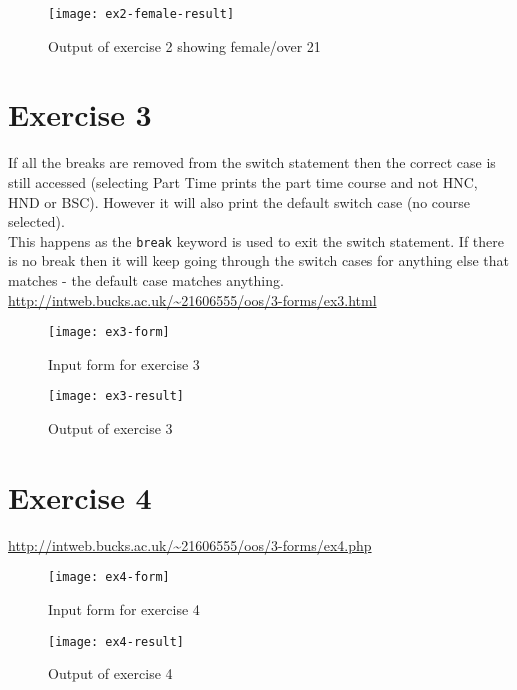 \begin{figure}[H]
  \caption{Output of exercise 2 showing female/over 21}
  \centering
  \texttt{[image: ex2-female-result]}
\end{figure}

\section{Exercise 3}

If all the breaks are removed from the switch statement then the correct case is still accessed (selecting Part Time prints the part time course and not HNC, HND or BSC). However it will also print the default switch case (no course selected).\\

This happens as the \texttt{break} keyword is used to exit the switch statement. If there is no break then it will keep going through the switch cases for anything else that matches - the default case matches anything.\\

\url{http://intweb.bucks.ac.uk/~21606555/oos/3-forms/ex3.html}
\clearpage
\captionsetup{type=figure}


\captionsetup{type=figure}


\begin{figure}[H]
  \caption{Input form for exercise 3}
  \centering
  \texttt{[image: ex3-form]}
\end{figure}

\begin{figure}[H]
  \caption{Output of exercise 3}
  \centering
  \texttt{[image: ex3-result]}
\end{figure}

\clearpage
\section{Exercise 4}

\url{http://intweb.bucks.ac.uk/~21606555/oos/3-forms/ex4.php}
\captionsetup{type=figure}


\begin{figure}[H]
  \caption{Input form for exercise 4}
  \centering
  \texttt{[image: ex4-form]}
\end{figure}

\begin{figure}[H]
  \caption{Output of exercise 4}
  \centering
  \texttt{[image: ex4-result]}
\end{figure}
